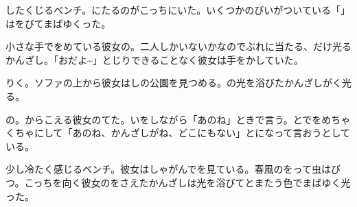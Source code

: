 
\author{Tomislav Mamić}


	\begin{bunshou}
		\hspace{15pt}したくじるベンチ。\hspace{3pt}にたるのがこっちにいた。\hspace{3pt}いくつかのびいがついている「」はをびてまばゆくった。
		
		\vspace{15pt}
		小さな手でをめている彼女の。\hspace{3pt}二人しかいないかなのでぶれに当たる、だけ光るかんざし。\hspace{3pt}「おだよ\textasciitilde」とじりできることなく彼女は手をかしていた。
		
		\vspace{15pt}
		りく。\hspace{3pt}ソファの上から彼女はしの公園を見つめる。\hspace{3pt}の光を浴びたかんざしがく光る。
		
		\vspace{15pt}
		の。\hspace{3pt}からこえる彼女のてた。\hspace{3pt}いをしながら「あのね」ときで言う。\hspace{3pt}とでをめちゃくちゃにして「あのね、かんざしがね、どこにもない」とになって言おうとしている。
		
		\vspace{15pt}
		少し冷たく感じるベンチ。\hspace{3pt}彼女はしゃがんでを見ている。\hspace{3pt}春風のをって虫はびつ。\hspace{3pt}こっちを向く彼女のをさえたかんざしは光を浴びてとまたう色でまばゆく光った。
	\end{bunshou}
